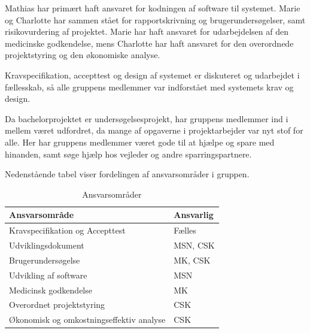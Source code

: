 Mathias har primært haft ansvaret for kodningen af software til systemet. Marie og Charlotte har sammen stået for rapportskrivning og brugerundersøgelser, samt risikovurdering af projektet. Marie har haft ansvaret for udarbejdelsen af den medicinske godkendelse, mens Charlotte har haft ansvaret for den overordnede projektstyring og den økonomiske analyse. 

Kravspecifikation, accepttest og design af systemet er diskuteret og udarbejdet i fællesskab, så alle gruppens medlemmer var indforstået med systemets krav og design. 

Da bachelorprojektet er undersøgelsesprojekt, har gruppens medlemmer ind i mellem været udfordret, da mange af opgaverne i projektarbejder var nyt stof for alle. Her har gruppens medlemmer været gode til at hjælpe og spare med hinanden, samt søge hjælp hos vejleder og andre sparringspartnere.  

Nedenstående tabel viser fordelingen af ansvarsområder i gruppen. 

\begin{table}[h]
\centering
\begin{tabular}{|l| p{}|}
\hline
\textbf{Ansvarsområde} &  \textbf{Ansvarlig} \\\hline
Kravspecifikation og Accepttest & Fælles \\\hline
Udviklingsdokument & MSN, CSK\\\hline
Brugerundersøgelse & MK, CSK \\\hline
Udvikling af software & MSN\\\hline
Medicinsk godkendelse & MK \\\hline
Overordnet projektstyring & CSK \\\hline
Økonomisk og omkostningseffektiv analyse & CSK \\\hline
\end{tabular}
\caption{Ansvarsområder}
\end{table}

